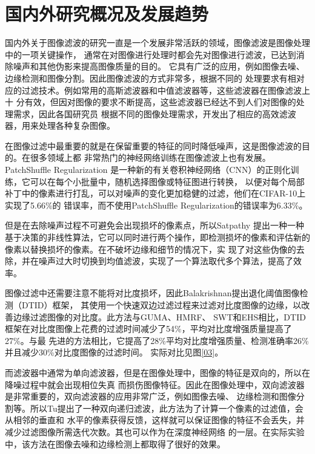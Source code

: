 %
%
%
%

\section{国内外研究概况及发展趋势}
国内外关于图像滤波的研究一直是一个发展非常活跃的领域，图像滤波是图像处理中的一项关键操作，
通常在对图像进行处理时都会先对图像进行滤波，已达到消除噪声和其他伪影来提高图像质量的目的。
它具有广泛的应用，例如图像去噪、边缘检测和图像分割。因此图像滤波的方式非常多，根据不同的
处理要求有相对应的过滤技术。例如常用的高斯滤波器和中值滤波器等，这些滤波器在图像滤波上十
分有效，但因对图像的要求不断提高，这些滤波器已经达不到人们对图像的处理需求，因此各国研究员
根据不同的图像处理需求，开发出了相应的高效滤波器，用来处理各种复杂图像。

在图像过滤中最重要的就是在保留重要的特征的同时降低噪声，这是图像滤波的目的。在很多领域上都
非常热门的神经网络训练在图像滤波上也有发展。PatchShuffle Regularization\cite{kangPatchShuffleRegularization2017}
是一种新的有关卷积神经网络（CNN）的正则化训练，它可以在每个小批量中，随机选择图像或特征图进行转换，
以便对每个局部补丁中的像素进行打乱，可以对噪声的变化更加稳健的过滤，他们在CIFAR-10上实现了5.66\%的
错误率，而不使用PatchShuffle Regularization的错误率为6.33\%。

但是在去除噪声过程不可避免会出现损坏的像素点，所以Satpathy\cite{satpathyAdaptiveNonlinearFiltering2022}
提出一种一种基于决策的非线性算法，它可以同时进行两个操作，即检测损坏的像素和评估新的像素以替换损坏的像素。在不破坏边缘和细节的情况下，实
现了对这些伪像的去除，并在噪声过大时切换到均值滤波，实现了一个算法取代多个算法，提高了效率。

图像过滤中还需要注意不能将对比度损坏，因此Balakrishnan\cite{natarajanContrastEnhancementBased2022}提出退化阈值图像检测（DTID）框架，
其使用一个快速双边过滤过程来过滤对比度图像的边缘，以改善边缘过滤图像的对比度。此方法与GUMA、HMRF、
SWT和EHS相比，DTID框架在对比度图像上花费的过滤时间减少了54\%，平均对比度增强质量提高了27\%。与最
先进的方法相比，它提高了28\%平均对比度增强质量、检测准确率26\%并且减少30\%对比度图像的过滤时间。
实际对比见图\ref{03}。

而滤波器中通常为单向滤波器，但是在图像处理中，图像的特征是双向的，所以在降噪过程中就会出现相位失真
而损伤图像特征。因此在图像处理中，双向滤波器是非常重要的，双向滤波器的应用非常广泛，例如图像去噪、
边缘检测和图像分割等。所以Tu\cite{tuTwoWayRecursiveFiltering2021}提出了一种双向递归滤波，此方法为了计算一个像素的过滤值，会从相邻的垂直和
水平的像素获得反馈，这样就可以保证图像的特征不会丢失，并减少过滤图像所需迭代次数。其也可以作为在深度神经网络
的一层。在实际实验中，该方法在图像去噪和边缘检测上都取得了很好的效果。

